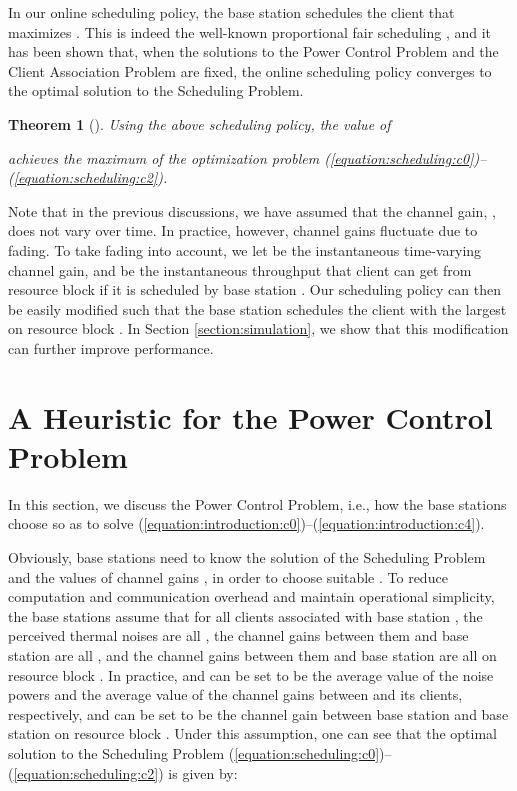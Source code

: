 \documentclass[conference]{IEEEtran}
\newtheorem{theorem}{\textbf{Theorem}}
\begin{document}
In our online scheduling policy, the base station schedules the client  that maximizes . This is indeed the well-known proportional fair scheduling \cite{HK04}, and it has been shown that, when the solutions to the Power Control Problem and the Client Association Problem are fixed, the online scheduling policy converges to the optimal solution to the Scheduling Problem.

\begin{theorem}[\cite{HK04}] \label{theorem:scheduling:optimal}
Using the above scheduling policy, the value of

achieves the maximum of the optimization problem
(\ref{equation:scheduling:c0})--(\ref{equation:scheduling:c2}).
\end{theorem}



Note that in the previous discussions, we have assumed that the channel gain, , does not vary over time. In practice, however, channel gains fluctuate due to fading. To take fading into account, we let  be the instantaneous time-varying channel gain, and  be the instantaneous throughput that client  can get from resource block  if it is scheduled by base station . Our scheduling policy can then be easily modified such that the base station schedules the client with the largest  on resource block . In Section \ref{section:simulation}, we show that this modification can further improve performance.


\section{A Heuristic for the Power Control Problem}
\label{section:power}

In this section, we discuss the Power Control Problem, i.e., how the base stations choose  so as to solve (\ref{equation:introduction:c0})--(\ref{equation:introduction:c4}).

Obviously, base stations need to know the solution of the Scheduling Problem
 and the values of channel gains
, in order to choose suitable . To
reduce computation and communication overhead and maintain operational simplicity, the base stations assume that
for all clients  associated with base station , the perceived thermal
noises are all , the channel gains between them and base station 
are all , and the channel gains between them and base station 
are all  on resource block . In practice,  and
 can be set to be the average value of the noise powers and the average value of the channel gains
between  and its clients, respectively, and
 can be set to be the
channel gain between base station  and base station  on resource block . Under this
assumption, one can see that the optimal solution to the Scheduling Problem (\ref{equation:scheduling:c0})--(\ref{equation:scheduling:c2}) is given by:
\end{document}
